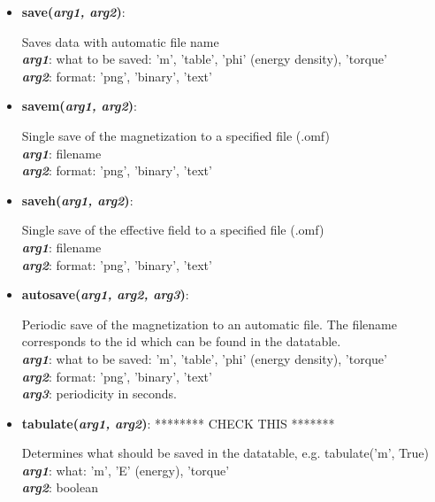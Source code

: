 \begin{itemize}

 \item {\textbf{save(\textit{arg1, arg2})}:
				\flushright\parbox{0.9 \textwidth}{\vspace{-0.25cm} 
				Saves data with automatic file name\\
				\textbf{\textit{arg1}}: what to be saved: 'm', 'table', 'phi' (energy density), 'torque'\\
				\textbf{\textit{arg2}}: format: 'png', 'binary', 'text'
				}\flushleft}

 \item {\vspace{-0.4cm}\textbf{savem(\textit{arg1, arg2})}:
				\flushright\parbox{0.9 \textwidth}{\vspace{-0.25cm} 
				Single save of the magnetization to a specified file (.omf)\\
				\textbf{\textit{arg1}}: filename\\
				\textbf{\textit{arg2}}: format: 'png', 'binary', 'text'
				}\flushleft}

 \item {\vspace{-0.4cm}\textbf{saveh(\textit{arg1, arg2})}:
				\flushright\parbox{0.9 \textwidth}{\vspace{-0.25cm} 
				Single save of the effective field to a specified file (.omf)\\
				\textbf{\textit{arg1}}: filename\\
				\textbf{\textit{arg2}}: format: 'png', 'binary', 'text'
				}\flushleft}

 \item {\vspace{-0.4cm}\textbf{autosave(\textit{arg1, arg2, arg3})}:
				\flushright\parbox{0.9 \textwidth}{\vspace{-0.25cm} 
				Periodic save of the magnetization to an automatic file.  The filename corresponds to the id which can be found in the datatable.\\
				\textbf{\textit{arg1}}: what to be saved: 'm', 'table', 'phi' (energy density), 'torque'\\
				\textbf{\textit{arg2}}: format: 'png', 'binary', 'text'\\
				\textbf{\textit{arg3}}: periodicity in seconds.
				}\flushleft}

 \item {\vspace{-0.4cm}\textbf{tabulate(\textit{arg1, arg2})}:  ******** CHECK THIS *******
				\flushright\parbox{0.9 \textwidth}{\vspace{-0.25cm} 
				Determines what should be saved in the datatable, e.g. tabulate('m', True)\\
				\textbf{\textit{arg1}}: what: 'm', 'E' (energy), 'torque'\\
				\textbf{\textit{arg2}}: boolean\\
				}\flushleft}


\end{itemize}
